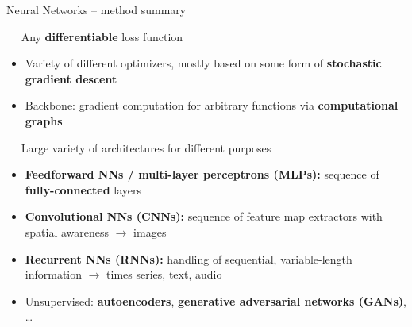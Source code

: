 
\begin{frame}{Neural Networks -- method summary}

\footnotesize

 ~~ Any \textbf{differentiable} loss function

\medskip


\begin{itemize}
  \item Variety of different optimizers, mostly based on some form of 
  \textbf{stochastic gradient descent}
  \item Backbone: gradient computation for arbitrary functions via 
  \textbf{computational graphs}
\end{itemize}

\medskip

 ~~ Large variety of architectures for different purposes
\begin{itemize}
  \item \textbf{Feedforward NNs / multi-layer perceptrons (MLPs):} sequence of 
  \textbf{fully-connected} layers
  \item \textbf{Convolutional NNs (CNNs):} sequence of feature map extractors 
  with spatial awareness $\rightarrow$ images
  \item \textbf{Recurrent NNs (RNNs):} handling of sequential, variable-length 
  information $\rightarrow$ times series, text, audio
  \item Unsupervised: \textbf{autoencoders}, \textbf{generative adversarial 
  networks (GANs)}, \dots
\end{itemize}



\end{frame}
